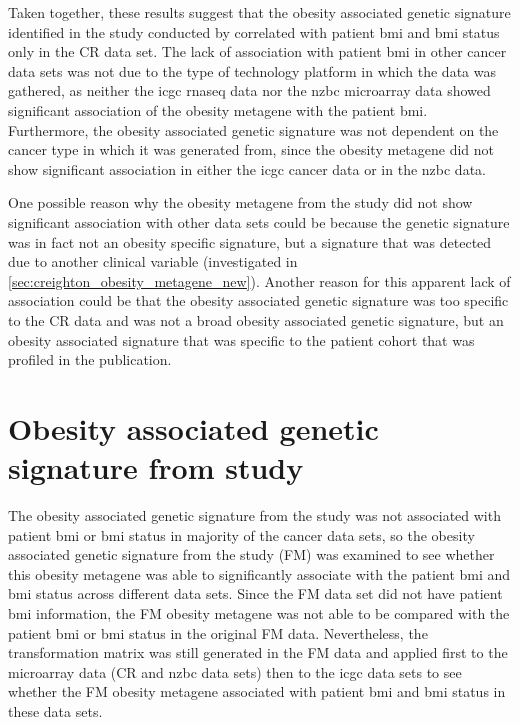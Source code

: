 Taken together, these results suggest that the obesity associated genetic signature identified in the study conducted by \citet{Creighton2012} correlated with patient \gls{bmi} and \gls{bmi} status only in the CR data set.
The lack of association with patient \gls{bmi} in other cancer data sets was not due to the type of technology platform in which the data was gathered, as neither the \gls{icgc} \gls{rnaseq} data nor the \gls{nzbc} microarray data showed significant association of the obesity metagene with the patient \gls{bmi}.
Furthermore, the obesity associated genetic signature was not dependent on the cancer type in which it was generated from, since the obesity metagene did not show significant association in either the \gls{icgc} cancer data or in the \gls{nzbc} data.

One possible reason why the obesity metagene from the \citet{Creighton2012} study did not show significant association with other data sets could be because the genetic signature was in fact not an obesity specific signature, but a signature that was detected due to another clinical variable (investigated in \cref{sec:creighton_obesity_metagene_new}).
Another reason for this apparent lack of association could be that the obesity associated genetic signature was too specific to the CR data and was not a broad obesity associated genetic signature, but an obesity associated signature that was specific to the patient cohort that was profiled in the \citet{Creighton2012} publication.

\section{Obesity associated genetic signature from \citet{Fuentes-Mattei2014} study}
\label{sec:fm_obesity_metagene}

The obesity associated genetic signature from the \citet{Creighton2012} study was not associated with patient \gls{bmi} or \gls{bmi} status in majority of the cancer data sets, so the obesity associated genetic signature from the \citet{Fuentes-Mattei2014} study (FM) was examined to see whether this obesity metagene was able to significantly associate with the patient \gls{bmi} and \gls{bmi} status across different  data sets.
Since the FM data set did not have patient \gls{bmi} information, the FM obesity metagene was not able to be compared with the patient \gls{bmi} or \gls{bmi} status in the original FM data.
Nevertheless, the transformation matrix was still generated in the FM data and applied first to the microarray data (CR and \gls{nzbc} data sets) then to the \gls{icgc} data sets to see whether the FM obesity metagene associated with patient \gls{bmi} and \gls{bmi} status in these data sets.

